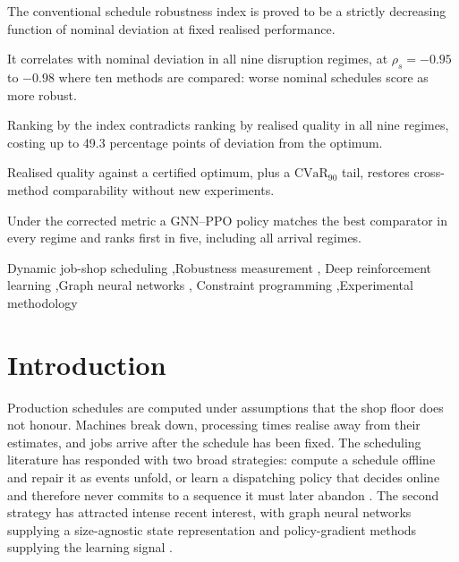 \documentclass[a4paper,fleqn]{cas-sc}
\newcommand{\CVaR}{\mathrm{CVaR}}
\begin{document}
\begin{highlights}
\item The conventional schedule robustness index is proved to be a strictly
decreasing function of nominal deviation at fixed realised performance.
\item It correlates with nominal deviation in all nine disruption regimes, at
$\rho_s=-0.95$ to $-0.98$ where ten methods are compared: worse nominal
schedules score as more robust.
\item Ranking by the index contradicts ranking by realised quality in all nine
regimes, costing up to 49.3 percentage points of deviation from the optimum.
\item Realised quality against a certified optimum, plus a $\CVaR_{90}$ tail,
restores cross-method comparability without new experiments.
\item Under the corrected metric a GNN--PPO policy matches the best comparator
in every regime and ranks first in five, including all arrival regimes.
\end{highlights}

\begin{keywords}
Dynamic job-shop scheduling \sep Robustness measurement \sep
Deep reinforcement learning \sep Graph neural networks \sep
Constraint programming \sep Experimental methodology
\end{keywords}

\maketitle

\section{Introduction}\label{sec:intro}

Production schedules are computed under assumptions that the shop floor does not
honour. Machines break down, processing times realise away from their estimates,
and jobs arrive after the schedule has been fixed. The scheduling literature has
responded with two broad strategies: compute a schedule offline and repair it as
events unfold, or learn a dispatching policy that decides online and therefore
never commits to a sequence it must later abandon
\citep{ouelhadj2009,aytug2005}. The second strategy has attracted intense
recent interest, with graph neural networks supplying a size-agnostic state
representation and policy-gradient methods supplying the learning signal
\citep{zhang2020,park2021,song2023,bengio2021}.
\end{document}
